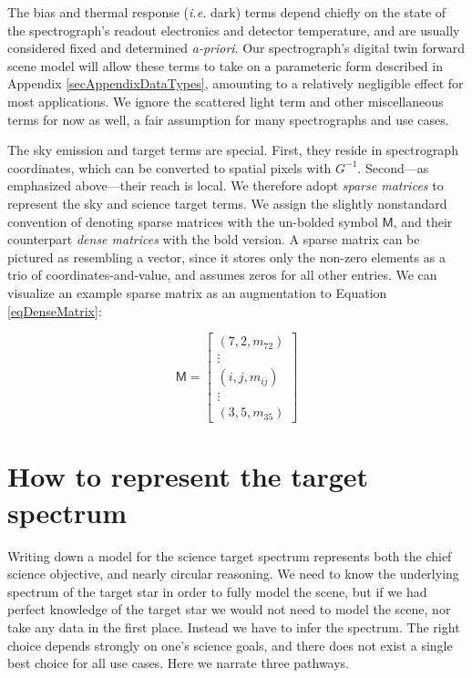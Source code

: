 \documentclass[twocolumn]{aastex631}
\begin{document}
The bias and thermal response (\emph{i.e.} dark) terms depend chiefly on the state of the spectrograph's readout electronics and detector temperature, and are usually considered fixed and determined \emph{a-priori}.  Our spectrograph's digital twin forward scene model will allow these terms to take on a parameteric form described in Appendix \ref{secAppendixDataTypes}, amounting to a relatively negligible effect for most applications.  We ignore the scattered light term and other miscellaneous terms for now as well, a fair assumption for many spectrographs and use cases.

The sky emission and target terms are special.  First, they reside in spectrograph coordinates, which can be converted to spatial pixels with $G^{-1}$.  Second---as emphasized above---their reach is local.  We therefore adopt \emph{sparse matrices} to represent the sky and science target terms. We assign the slightly nonstandard convention of denoting sparse matrices with the un-bolded symbol $\mathsf{M}$, and their counterpart \emph{dense matrices} with the bold version.  A sparse matrix can be pictured as resembling a vector, since it stores only the non-zero elements as a trio of coordinates-and-value, and assumes zeros for all other entries.  We can visualize an example sparse matrix as an augmentation to Equation \ref{eqDenseMatrix}:

\begin{equation}
  \mathsf{M} =  \begin{bmatrix}
    (7, 2, m_{72}) \\
    \vdots         \\
    (i, j, m_{ij}) \\
    \vdots         \\
    (3, 5, m_{35})    \label{eqSparseMatrix}
  \end{bmatrix}
\end{equation}

\section{How to represent the target spectrum}
Writing down a model for the science target spectrum represents both the chief science objective, and nearly circular reasoning. We need to know the underlying spectrum of the target star in order to fully model the scene, but if we had perfect knowledge of the target star we would not need to model the scene, nor take any data in the first place.  Instead we have to infer the spectrum.  The right choice depends strongly on one's science goals, and there does not exist a single best choice for all use cases.  Here we narrate three pathways.
\end{document}
